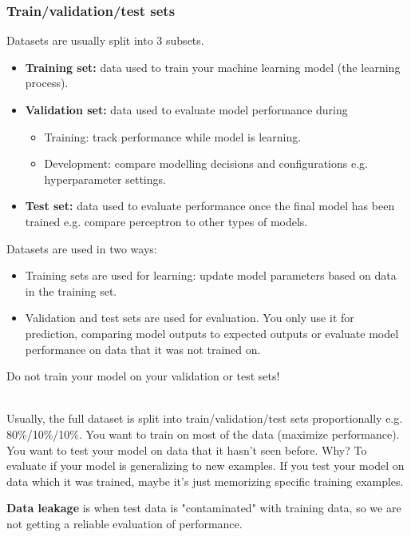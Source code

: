 \documentclass[11pt]{article}
\begin{document}
\subsubsection{Train/validation/test sets}
Datasets are usually split into 3 subsets.
\begin{itemize}
    \item \textbf{Training set:} data used to train your machine learning model (the learning process).
    \item \textbf{Validation set:} data used to evaluate model performance during
    \begin{itemize}
        \item Training: track performance while model is learning.
        \item Development: compare modelling decisions and configurations e.g. hyperparameter settings.
    \end{itemize}
    \item \textbf{Test set:} data used to evaluate performance once the final model has been trained e.g. compare perceptron to other types of models.
\end{itemize}
Datasets are used in two ways:
\begin{itemize}
    \item Training sets are used for learning: update model parameters based on data in the training set.
    \item Validation and test sets are used for evaluation. You only use it for prediction, comparing model outputs to expected outputs or evaluate model performance on data that it was not trained on.
\end{itemize}
\begin{warning}
Do not train your model on your validation or test sets!
\end{warning}
$\quad$\\[-1em]
Usually, the full dataset is split into train/validation/test sets proportionally e.g. 80\%/10\%/10\%.
You want to train on most of the data (maximize performance). You want to test your model on data that it hasn't seen before. Why?
To evaluate if your model is generalizing to new examples. If you test your model on data which it was trained, maybe it's just memorizing specific training examples.
\begin{definition}
\textbf{Data leakage} is when test data is "contaminated" with training data, so we are not getting a reliable evaluation of performance.
\end{definition}
\end{document}
